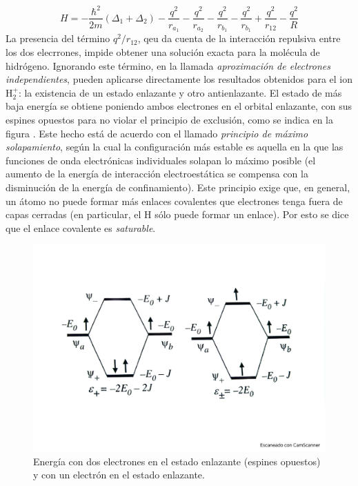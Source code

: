\begin{equation*}
    H = - \frac{\hbar^2}{2m} (\Delta_1 + \Delta_2) - \frac{q^2}{r_{a_1}} - \frac{q^2}{r_{a_2}} - \frac{q^2}{r_{b_1}} - \frac{q^2}{r_{b_1}} + \frac{q^2}{r_{12}} - \frac{q^2}{R}
\end{equation*}
La presencia del término $q^2/r_{12}$, qeu da cuenta de la interacción repulsiva entre los dos elecrrones, impide obtener una solución exacta para la molécula de hidrógeno. Ignorando este término, en la llamada \textit{aproximación de electrones independientes}, pueden aplicarse directamente los resultados obtenidos para el ion H$_2^+$: la existencia de un estado enlazante y otro antienlazante. El estado de más baja energía se obtiene poniendo ambos electrones en el orbital enlazante, con sus espines opuestos para no violar el principio de exclusión, como se indica en la figura . Este hecho está de acuerdo con el llamado \textit{principio de máximo solapamiento}, según la cual la configuración más estable es aquella en la que las funciones de onda electrónicas individuales solapan lo máximo posible (el aumento de la energía de interacción electroestática se compensa con la disminución de la energía de confinamiento). Este principio exige que, en general, un átomo no puede formar más enlaces covalentes que electrones tenga fuera de capas cerradas (en particular, el H sólo puede formar un enlace). Por esto se dice que el enlace covalente es \textit{saturable}. 

\begin{figure}[h!] \centering
    \includegraphics[scale=0.5]{Cuerpo/Ch_03/Fotos libro 5.pdf}
    \caption{Energía con dos electrones en el estado enlazante (espines opuestos) y con un electrón en el estado enlazante.}
    \label{Fig:03-06}
\end{figure}    


